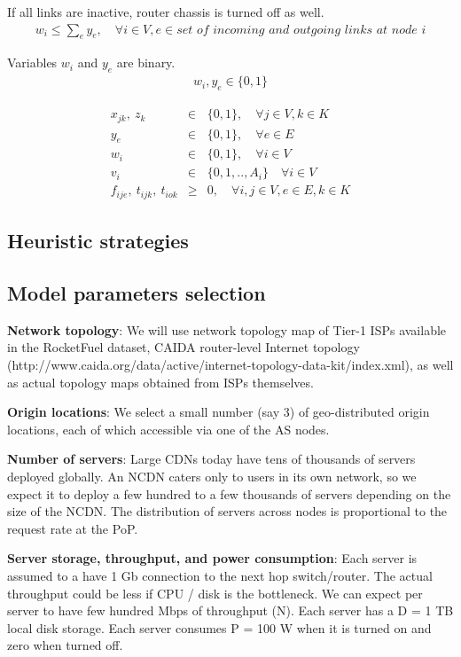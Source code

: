 If all links are inactive, router chassis is turned off as well.
\begin{eqnarray}
w_i \leq  \sum_e y_e,  \quad\forall i \in V,  e\in \textit{set of incoming and outgoing links at node } i
\end{eqnarray}

Variables $w_i$ and $y_e$ are binary.
\begin{eqnarray*}
w_i, y_e \in \{0, 1\}
\end{eqnarray*}

\begin{eqnarray*}
x_{jk}, \ z_k &\in& \{0,1\}, \quad \forall j \in V, k \in K\\
y_{e}  &\in& \{0,1\}, \quad \forall e \in E\\
w_{i}  &\in& \{0,1\}, \quad \forall i \in V\\
v_i &\in& \{0, 1, .., A_i \} \quad \forall i \in V \\
f_{ije}, \ t_{ijk}, \ t_{iok} &\geq& 0, \quad \forall  i,j \in V, e \in E, k\in K
\end{eqnarray*}


\subsection{Heuristic strategies}

\subsection{Model parameters selection}


\textbf{Network topology}: We will use network topology map of Tier-1 ISPs available in the RocketFuel dataset, CAIDA router-level Internet topology (http://www.caida.org/data/active/internet-topology-data-kit/index.xml), as well as actual topology maps obtained from ISPs themselves. 

\textbf{Origin locations}: We select a small number (say 3) of geo-distributed origin locations, each of which accessible via one of the AS nodes.


\textbf{Number of servers}:  Large CDNs today have tens of thousands of servers deployed globally. An NCDN caters only to users in its own network, so we expect it to deploy a few hundred to a few thousands of servers depending on the size of the NCDN. The distribution of servers across nodes is proportional to the request rate at the PoP.


\textbf{Server storage, throughput, and power consumption}: Each server is assumed to a have 1 Gb connection to the next hop switch/router.  The actual throughput could be less if CPU / disk is the bottleneck. We can expect per server to have few hundred Mbps of throughput (N). Each server has a D = 1 TB local disk storage.  Each server consumes P = 100 W when it is turned on and zero when turned off. 

